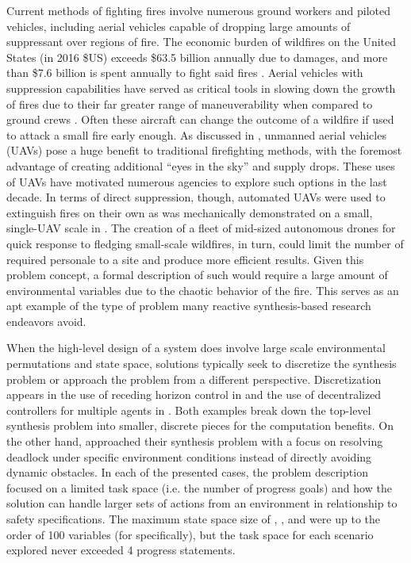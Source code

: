 \documentclass{ieeeaccess}
\begin{document}
Current methods of fighting fires involve numerous ground workers and piloted vehicles, including aerial vehicles capable of dropping large amounts of suppressant over regions of fire. The economic burden of wildfires on the United States (in 2016 \$US) exceeds \$63.5 billion annually due to damages, and more than \$7.6 billion is spent annually to fight said fires \cite{c0}. Aerial vehicles with suppression capabilities have served as critical tools in slowing down the growth of fires due to their far greater range of maneuverability when compared to ground crews \cite{c21}. Often these aircraft can change the outcome of a wildfire if used to attack a small fire early enough. As discussed in \cite{c1}, unmanned aerial vehicles (UAVs) pose a huge benefit to traditional firefighting methods, with the foremost advantage of creating additional ``eyes in the sky'' and supply drops. These uses of UAVs have motivated numerous agencies to explore such options in the last decade. In terms of direct suppression, though, automated UAVs were used to extinguish fires on their own as was mechanically demonstrated on a small, single-UAV scale in \cite{c2}. The creation of a fleet of mid-sized autonomous drones for quick response to fledging small-scale wildfires, in turn, could limit the number of required personale to a site and produce more efficient results. Given this problem concept, a formal description of such would require a large amount of environmental variables due to the chaotic behavior of the fire. This serves as an apt example of the type of problem many reactive synthesis-based research endeavors avoid.

When the high-level design of a system does involve large scale environmental permutations and state space, solutions typically seek to discretize the synthesis problem or approach the problem from a different perspective. Discretization appears in the use of receding horizon control in \cite{c3} and the use of decentralized controllers for multiple agents in \cite{c4}. Both examples break down the top-level synthesis problem into smaller, discrete pieces for the computation benefits. On the other hand, \cite{c5} approached their synthesis problem with a focus on resolving deadlock under specific environment conditions instead of directly avoiding dynamic obstacles. In each of the presented cases, the problem description focused on a limited task space (i.e. the number of progress goals) and how the solution can handle larger sets of actions from an environment in relationship to safety specifications. The maximum state space size of \cite{c3}, \cite{c4}, and \cite{c5} were up to the order of 100 variables (for \cite{c5} specifically), but the task space for each scenario explored never exceeded 4 progress statements.
\end{document}
